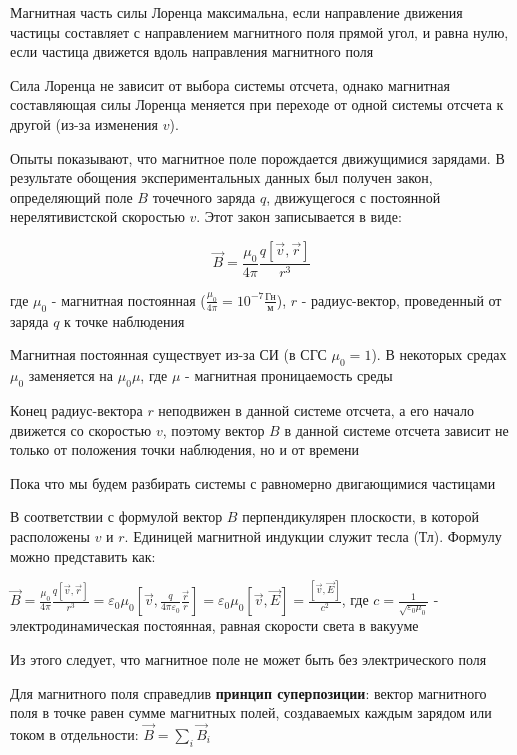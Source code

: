 Магнитная часть силы Лоренца максимальна, если направление движения частицы составляет с направлением магнитного поля 
прямой угол, и равна нулю, если частица движется вдоль направления магнитного поля

Сила Лоренца не зависит от выбора системы отсчета, однако магнитная составляющая силы Лоренца меняется при переходе от одной
системы отсчета к другой (из-за изменения $v$).

Опыты показывают, что магнитное поле порождается движущимися зарядами. В результате обощения экспериментальных данных
был получен закон, определяющий поле $B$ точечного заряда $q$, движущегося с постоянной нерелятивистской скоростью $v$. 
Этот закон записывается в виде:

\[\vec{B} = \frac{\mu_0}{4\pi} \frac{q [\vec{v}, \vec{r}]}{r^3}\]

где $\mu_0$ - магнитная постоянная ($\frac{\mu_0}{4\pi} = 10^{-7} \frac{\text{Гн}}{\text{м}}$), $r$ - радиус-вектор, проведенный от заряда $q$ к точке наблюдения

Магнитная постоянная существует из-за СИ (в СГС $\mu_0 = 1$). В некоторых средах $\mu_0$ заменяется на $\mu_0 \mu$, где $\mu$ - магнитная проницаемость среды

\mediumvspace

Конец радиус-вектора $r$ неподвижен в данной системе отсчета, а его начало движется со скоростью $v$, поэтому
вектор $B$ в данной системе отсчета зависит не только от положения точки наблюдения, но и от времени

Пока что мы будем разбирать системы с равномерно двигающимися частицами

В соответствии с формулой вектор $B$ перпендикулярен плоскости, в которой расположены $v$ и $r$.
Единицей магнитной индукции служит тесла (Тл). Формулу можно представить как:

$\vec{B} = \frac{\mu_0}{4\pi} \frac{q [\vec{v}, \vec{r}]}{r^3} = \varepsilon_0 \mu_0 \left[\vec{v}, \frac{q}{4\pi\varepsilon_0} \frac{\vec{r}}{r}\right] = 
\varepsilon_0 \mu_0 [\vec{v}, \vec{E}] = \frac{[\vec{v}, \vec{E}]}{c^2}$, где $c = \frac{1}{\sqrt{\varepsilon_0 \mu_0}}$ - электродинамическая постоянная, равная скорости света в вакууме

Из этого следует, что магнитное поле не может быть без электрического поля

\mediumvspace

Для магнитного поля справедлив \textbf{принцип суперпозиции}: вектор магнитного поля в точке равен сумме магнитных полей,
создаваемых каждым зарядом или током в отдельности: $\vec{B} = \sum_i \vec{B}_i$

